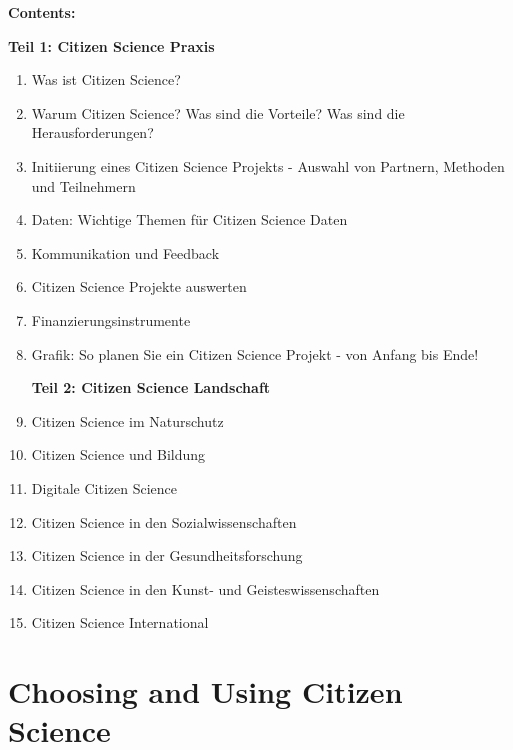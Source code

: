 \documentclass{article}
\begin{document}
\textbf{Contents:} 


\textbf{Teil 1: Citizen Science Praxis}

\begin{enumerate}
\item Was ist Citizen Science?


\item Warum Citizen Science? Was sind die Vorteile? Was sind die Herausforderungen?


\item Initiierung eines Citizen Science Projekts - Auswahl von Partnern, Methoden und Teilnehmern


\item Daten: Wichtige Themen für Citizen Science Daten


\item Kommunikation und Feedback


\item Citizen Science Projekte auswerten


\item Finanzierungsinstrumente


\item Grafik: So planen Sie ein Citizen Science Projekt - von Anfang bis Ende!


\textbf{Teil 2: Citizen Science Landschaft}


\item Citizen Science im Naturschutz


\item Citizen Science und Bildung


\item Digitale Citizen Science


\item Citizen Science in den Sozialwissenschaften


\item Citizen Science in der Gesundheitsforschung


\item Citizen Science in den Kunst- und Geisteswissenschaften


\item Citizen Science International


\end{enumerate}

\section{Choosing and Using Citizen Science}\label{H1285339}
\end{document}
